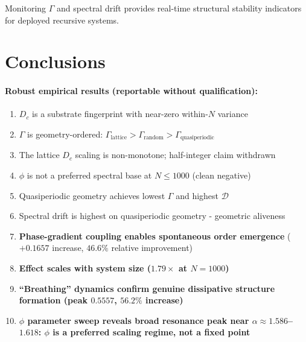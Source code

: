 \documentclass[12pt,a4paper]{article}
\theoremstyle{plain}
\theoremstyle{definition}
\begin{document}
Monitoring $\Gamma$ and spectral drift provides real-time structural
stability indicators for deployed recursive systems.

\section{Conclusions}
\label{sec:conclusions}

\paragraph{Robust empirical results (reportable without qualification):}
\begin{enumerate}
  \item $D_c$ is a substrate fingerprint with near-zero within-$N$
        variance
  \item $\Gamma$ is geometry-ordered:
        $\Gamma_{\text{lattice}} > \Gamma_{\text{random}} >
        \Gamma_{\text{quasiperiodic}}$
  \item The lattice $D_c$ scaling is non-monotone; half-integer claim
        withdrawn
  \item $\phi$ is not a preferred spectral base at $N \leq 1000$ (clean
        negative)
  \item Quasiperiodic geometry achieves lowest $\Gamma$ and highest
        $\mathcal{D}$
  \item Spectral drift is highest on quasiperiodic geometry - geometric
        aliveness
  \item \textbf{Phase-gradient coupling enables spontaneous order
        emergence} ($+0.1657$ increase, $46.6\%$ relative improvement)
  \item \textbf{Effect scales with system size ($1.79\times$ at
        $N=1000$)}
  \item \textbf{``Breathing'' dynamics confirm genuine dissipative
        structure formation (peak $0.5557$, $56.2\%$ increase)}
  \item \textbf{$\phi$ parameter sweep reveals broad resonance peak
        near $\alpha \approx 1.586$--$1.618$: $\phi$ is a preferred
        scaling regime, not a fixed point}
\end{enumerate}
\end{document}
